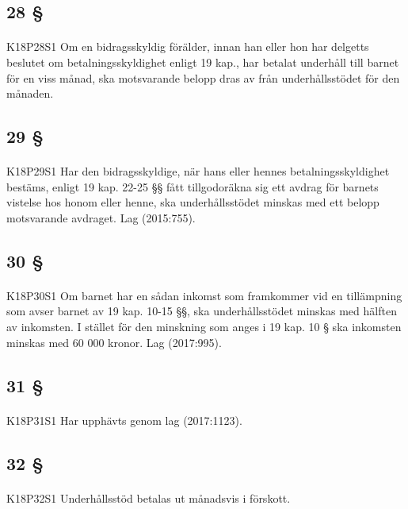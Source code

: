 \documentclass[a4paper,notitlepage,openany,10pt]{book}
\begin{document}
\subsection*{28 §}
\paragraph*{}
{\tiny K18P28S1}
Om en bidragsskyldig förälder, innan han eller hon har delgetts beslutet om betalningsskyldighet enligt 19 kap., har betalat underhåll till barnet för en viss månad, ska motsvarande belopp dras av från underhållsstödet för den månaden.
\subsection*{29 §}
\paragraph*{}
{\tiny K18P29S1}
Har den bidragsskyldige, när hans eller hennes betalningsskyldighet bestäms, enligt 19 kap. 22-25 §§ fått tillgodoräkna sig ett avdrag för barnets vistelse hos honom eller henne, ska underhållsstödet minskas med ett belopp motsvarande avdraget.
Lag (2015:755).
\subsection*{30 §}
\paragraph*{}
{\tiny K18P30S1}
Om barnet har en sådan inkomst som framkommer vid en tillämpning som avser barnet av 19 kap. 10-15 §§, ska underhållsstödet minskas med hälften av inkomsten. I stället för den minskning som anges i 19 kap. 10 § ska inkomsten minskas med 60 000 kronor.
Lag (2017:995).
\subsection*{31 §}
\paragraph*{}
{\tiny K18P31S1}
Har upphävts genom
lag (2017:1123).
\subsection*{32 §}
\paragraph*{}
{\tiny K18P32S1}
Underhållsstöd betalas ut månadsvis i förskott.
\end{document}
